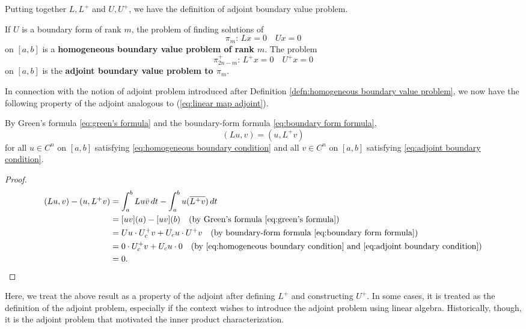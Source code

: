 \documentclass[11pt, oneside, a4paper]{article}
\begin{document}
Putting together $L, L^+$ and $U, U^+$, we have the definition of adjoint boundary value problem.

\begin{defn}\cite[p.291]{CoddingtonLevinson}\label{defn:adjoint boundary value problem}
    If $U$ is a boundary form of rank $m$, the problem of finding solutions of
    \[\pi_m:\,Lx=0\quad Ux=0\]
    on $[a,b]$ is a \textbf{homogeneous boundary value problem of rank $m$}. The problem
    \[\pi_{2n-m}^+:\,L^+x=0\quad U^+x=0\]
    on $[a,b]$ is the \textbf{adjoint boundary value problem to $\pi_m$}.
\end{defn}

In connection with the notion of adjoint problem introduced after Definition \ref{defn:homogeneous boundary value problem}, we now have the following property of the adjoint analogous to (\ref{eq:linear map adjoint}).

\begin{prop}\label{prop:(Lu,v)=(u,L^+v)}
    By Green's formula \eqref{eq:green's formula} and the boundary-form formula \eqref{eq:boundary form formula}, 
    \[(Lu, v) = (u, L^+v)\]
    for all $u\in C^n$ on $[a,b]$ satisfying \eqref{eq:homogeneous boundary condition} and all $v\in C^n$ on $[a,b]$ satisfying \eqref{eq:adjoint boundary condition}.
\end{prop}
\begin{proof}
    \begin{equation}
        \begin{split}
            (Lu, v) - (u, L^+v) &= \int_a^b Lu\bar{v}\,dt - \int_a^b u(\overline{L^+v})\,dt\\
            &= [uv](a) - [uv](b) \quad\mbox{(by Green's formula \eqref{eq:green's formula})}\\
            &= Uu\cdot U_c^+ v + U_c u\cdot U^+v \quad\mbox{(by boundary-form formula \eqref{eq:boundary form formula})}\\
            &= 0\cdot U_c^+ v + U_c u \cdot 0 \quad\mbox{(by \eqref{eq:homogeneous boundary condition} and \eqref{eq:adjoint boundary condition})}\\
            &= 0.\qedhere
        \end{split}
    \end{equation}
\end{proof}

Here, we treat the above result as a property of the adjoint after defining $L^+$ and constructing $U^+$. 
In some cases, it is treated as the definition of the adjoint problem, especially if the context wishes to introduce the adjoint problem using linear algebra. Historically, though, it is the adjoint problem that motivated the inner product characterization.
\end{document}
